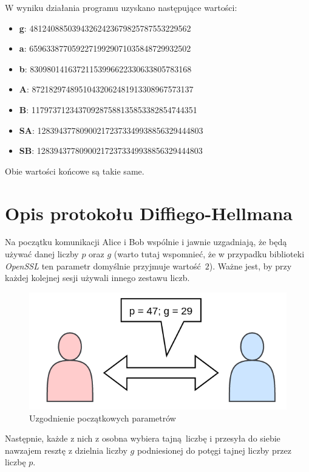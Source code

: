 \documentclass[12pt]{article}
\begin{document}
W wyniku działania programu uzyskano następujące wartości:
\begin{itemize}
	\item \textbf{g}: 48124088503943262423679825787553229562
	\item \textbf{a}: 65963387705922719929071035848729932502
	\item \textbf{b}: 83098014163721153996622330633805783168
	\item \textbf{A}: 87218297489510432062481913308967573137
	\item \textbf{B}: 117973712343709287588135853382854744351
	\item \textbf{SA}: 128394377809002172373349938856329444803
	\item \textbf{SB}: 128394377809002172373349938856329444803
\end{itemize}

Obie wartości końcowe są takie same.

\section{Opis protokołu Diffiego-Hellmana}

Na początku komunikacji Alice i Bob wspólnie i jawnie uzgadniają, że będą używać danej liczby $p$ oraz $g$ (warto tutaj wspomnieć, że w przypadku biblioteki \textit{OpenSSL} ten parametr domyślnie przyjmuje wartość $2$).
Ważne jest, by przy każdej kolejnej sesji używali innego zestawu liczb.

\begin{figure}[h!]
	\begin{center}
		\includegraphics[scale=0.3]{4-dh-diagram-1}
	\end{center}
	\caption{Uzgodnienie początkowych parametrów}
\end{figure}

Następnie, każde z nich z osobna wybiera tajną liczbę i przesyła do siebie nawzajem resztę z dzielnia liczby $g$ podniesionej do potęgi tajnej liczby przez liczbę $p$.
\end{document}
